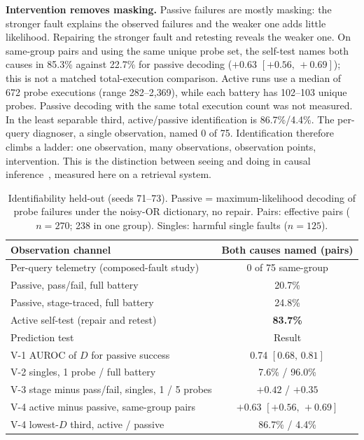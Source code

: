 \documentclass[conference]{IEEEtran}
\newcommand{\ci}[2]{[#1,\,#2]}
\begin{document}
\textbf{Intervention removes masking.} Passive failures are mostly masking: the stronger fault explains the observed failures and the weaker one adds little likelihood. Repairing the stronger fault and retesting reveals the weaker one. On same-group pairs and using the same unique probe set, the self-test names both causes in 85.3\% against 22.7\% for passive decoding ($+0.63$ $\ci{+0.56}{+0.69}$); this is not a matched total-execution comparison. Active runs use a median of 672 probe executions (range 282--2{,}369), while each battery has 102--103 unique probes. Passive decoding with the same total execution count was not measured. In the least separable third, active/passive identification is 86.7\%/4.4\%. The per-query diagnoser, a single observation, named 0 of 75. Identification therefore climbs a ladder: one observation, many observations, observation points, intervention. This is the distinction between seeing and doing in causal inference~\cite{pearl2009causality}, measured here on a retrieval system.

\begin{table}[t]
\caption{Identifiability held-out (seeds 71--73). Passive = maximum-likelihood decoding of probe failures under the noisy-OR dictionary, no repair. Pairs: effective pairs ($n{=}270$; 238 in one group). Singles: harmful single faults ($n{=}125$).}
\label{tab:ladder}
\centering\footnotesize
\begin{tabular}{@{}lc@{}}
\toprule
Observation channel & Both causes named (pairs)\\
\midrule
Per-query telemetry (composed-fault study) & 0 of 75 same-group\\
Passive, pass/fail, full battery & 20.7\%\\
Passive, stage-traced, full battery & 24.8\%\\
Active self-test (repair and retest) & \textbf{83.7\%}\\
\midrule
Prediction test & Result\\
\midrule
V-1 AUROC of $D$ for passive success & 0.74 $\ci{0.68}{0.81}$\\
V-2 singles, 1 probe / full battery & 7.6\% / 96.0\%\\
V-3 stage minus pass/fail, singles, 1 / 5 probes & $+0.42$ / $+0.35$\\
V-4 active minus passive, same-group pairs & $+0.63$ $\ci{+0.56}{+0.69}$\\
V-4 lowest-$D$ third, active / passive & 86.7\% / 4.4\%\\
\bottomrule
\end{tabular}
\end{table}
\end{document}
